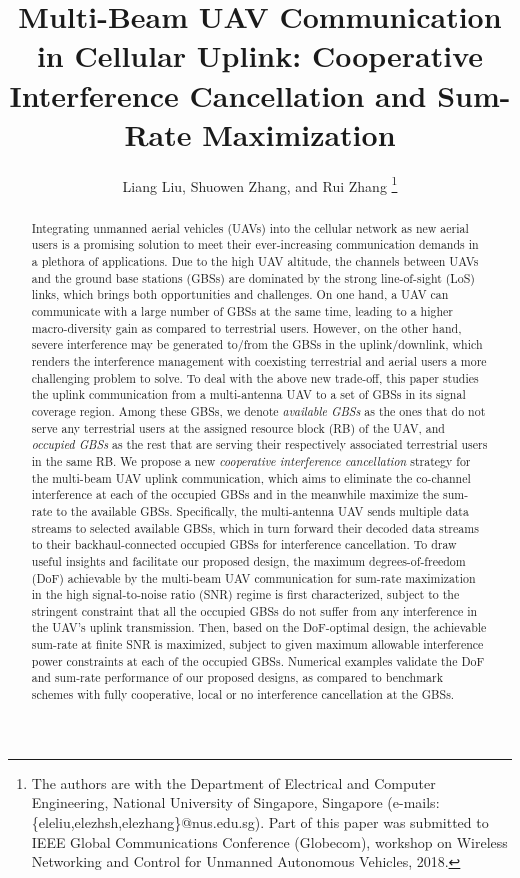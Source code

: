 \documentclass[onecolumn, draftclsnofoot, 12pt]{IEEEtran}
\title{Multi-Beam UAV Communication in Cellular Uplink: Cooperative Interference Cancellation and Sum-Rate Maximization}
\author{Liang Liu, Shuowen Zhang, and Rui Zhang
\thanks{The authors are with the Department of Electrical and
Computer Engineering, National University of Singapore, Singapore
(e-mails: \{eleliu,elezhsh,elezhang\}@nus.edu.sg). Part of this paper was submitted to IEEE Global Communications Conference (Globecom), workshop on Wireless Networking and Control for Unmanned Autonomous Vehicles, 2018. }}
\begin{document}
\maketitle \thispagestyle{empty} \vspace{-0.3in}

\begin{abstract}
Integrating unmanned aerial vehicles (UAVs) into the cellular network as new aerial users is a promising solution to meet their ever-increasing communication demands in a plethora of applications. Due to the high UAV altitude, the channels between UAVs and the ground base stations (GBSs) are dominated by the strong line-of-sight (LoS) links, which brings both opportunities and challenges. On one hand, a UAV can communicate with a large number of GBSs at the same time, leading to a higher macro-diversity gain as compared to terrestrial users. However, on the other hand, severe interference may be generated to/from the GBSs in the uplink/downlink, which renders the interference management with coexisting terrestrial and aerial users a more challenging problem to solve. To deal with the above new trade-off, this paper studies the uplink communication from a multi-antenna UAV to a set of GBSs in its signal coverage region. Among these GBSs, we denote \emph{available GBSs} as the ones that do not serve any terrestrial users at the assigned resource block (RB) of the UAV, and \emph{occupied GBSs} as the rest that are serving their respectively associated terrestrial users in the same RB. We propose a new \emph{cooperative interference cancellation} strategy for the multi-beam UAV uplink communication, which aims to eliminate the co-channel interference at each of the occupied GBSs and in the meanwhile maximize the sum-rate to the available GBSs. Specifically, the multi-antenna UAV sends multiple data streams to selected available GBSs, which in turn forward their decoded data streams to their backhaul-connected occupied GBSs for interference cancellation. To draw useful insights and facilitate our proposed design, the maximum degrees-of-freedom (DoF) achievable by the multi-beam UAV communication for sum-rate maximization in the high signal-to-noise ratio (SNR) regime is first characterized, subject to the stringent constraint that all the occupied GBSs do not suffer from any interference in the UAV's uplink transmission. Then, based on the DoF-optimal  design, the achievable sum-rate at finite SNR is maximized, subject to given maximum allowable interference power constraints at each of the occupied GBSs. Numerical examples validate the DoF and sum-rate performance of our proposed designs, as compared to benchmark schemes with fully cooperative, local or no interference cancellation at the GBSs.
\end{abstract}
\end{document}
